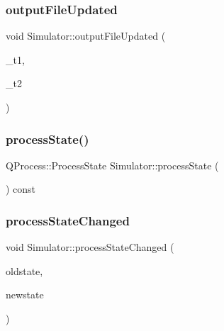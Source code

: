 \subsubsection{\texorpdfstring{outputFileUpdated}{outputFileUpdated}}
{\footnotesize\ttfamily void Simulator\+::output\+File\+Updated (\begin{DoxyParamCaption}\item[{Q\+String}]{\+\_\+t1,  }\item[{int}]{\+\_\+t2 }\end{DoxyParamCaption})\hspace{0.3cm}{\ttfamily [signal]}}

\mbox{\label{class_simulator_a2f3c6e304118ae1f881610d1d3eb7f8f}} 
\subsubsection{\texorpdfstring{processState()}{processState()}}
{\footnotesize\ttfamily Q\+Process\+::\+Process\+State Simulator\+::process\+State (\begin{DoxyParamCaption}{ }\end{DoxyParamCaption}) const}

\mbox{\label{class_simulator_a3db10c90bcd5ba05ebfeeed1edf15b38}} 
\subsubsection{\texorpdfstring{processStateChanged}{processStateChanged}}
{\footnotesize\ttfamily void Simulator\+::process\+State\+Changed (\begin{DoxyParamCaption}\item[{Q\+Process\+::\+Process\+State}]{oldstate,  }\item[{Q\+Process\+::\+Process\+State}]{newstate }\end{DoxyParamCaption})\hspace{0.3cm}{\ttfamily [signal]}}

\mbox{\label{class_simulator_a2d9b64b4027c60d66a010311e007c6e4}} 
